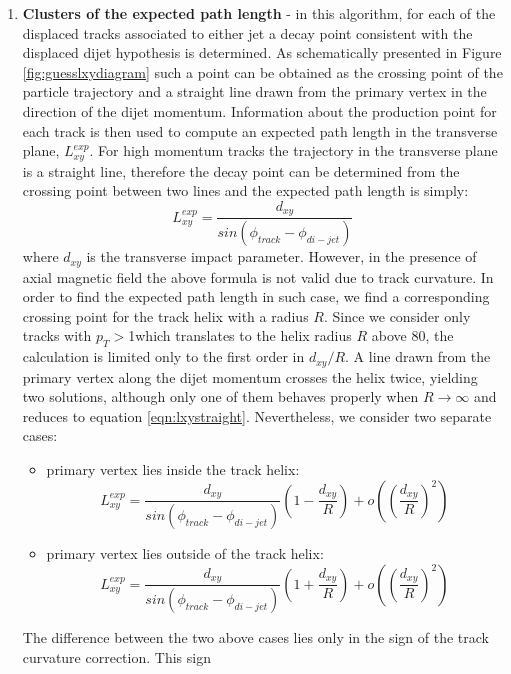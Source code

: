 \begin{enumerate}
\item{\bf Clusters of the expected path length}  
\label{subsec:Clusters}
- in this algorithm, for each of the displaced tracks associated to either jet a decay point consistent 
with the displaced dijet hypothesis 
is determined. As schematically presented in Figure 
\ref{fig:guesslxydiagram} such a point 
 can be obtained as the crossing point of   
the particle trajectory and a straight line drawn from the primary vertex in the direction of the dijet momentum.  
Information about the production point for each track is then used to compute an expected path length in the
transverse plane, $L_{xy}^{exp}$.  
For high momentum tracks the trajectory in the transverse plane is a straight line,
 therefore the decay point can be determined from the crossing point between two lines
 and the expected path length is simply:
\begin{equation}
 L_{xy}^{exp}=\frac{d_{xy}}{sin(\phi_{track} - \phi_{di-jet})}
\label{eqn:lxystraight}
\end{equation}
where $d_{xy}$ is the transverse impact parameter. However, in the presence of axial magnetic field 
the above formula is not valid due to track curvature. In order to find the expected path length in such case,
 we find a corresponding crossing point for the track helix with a radius $R$. Since we consider only
tracks with $p_T>$1\GeV which translates to the helix radius $R$ above 80\cm, 
the calculation is limited only to the first order in 
$d_{xy}/R$. 
 A line drawn from the primary vertex along the dijet momentum crosses the helix twice, yielding
 two solutions, although only one of them behaves properly when $R \to \infty$ 
and reduces to equation \ref{eqn:lxystraight}. Nevertheless, we consider two  
separate cases:
\begin{itemize}
 \item primary vertex lies inside the track helix:
\begin{equation}
 L_{xy}^{exp} = \frac{d_{xy}}{sin(\phi_{track} - \phi_{di-jet})} (1 - \frac{d_{xy}}{R}) + o((\frac{d_{xy}}{R})^2)
\end{equation} 
 \item primary vertex lies outside of the track helix:
\begin{equation}
 L_{xy}^{exp} = \frac{d_{xy}}{sin(\phi_{track} - \phi_{di-jet})} (1 + \frac{d_{xy}}{R}) + o((\frac{d_{xy}}{R})^2)
\end{equation} 
\end{itemize}
The difference between the two above cases lies only in the sign of the track curvature correction. This sign

\end{enumerate}
